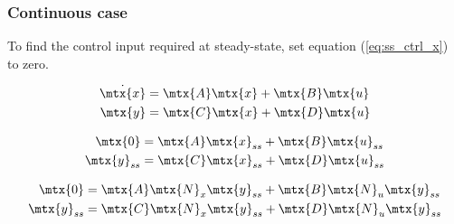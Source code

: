 \subsubsection{Continuous case}

To find the \gls{control input} required at steady-state, set equation
(\ref{eq:ss_ctrl_x}) to zero.

\begin{align*}
  \dot{\mtx{x}} &= \mtx{A}\mtx{x} + \mtx{B}\mtx{u} \\
  \mtx{y} &= \mtx{C}\mtx{x} + \mtx{D}\mtx{u}
\end{align*}

\begin{align*}
  \mtx{0} &= \mtx{A}\mtx{x}_{ss} + \mtx{B}\mtx{u}_{ss} \\
  \mtx{y}_{ss} &= \mtx{C}\mtx{x}_{ss} + \mtx{D}\mtx{u}_{ss}
\end{align*}

\begin{align*}
  \mtx{0} &= \mtx{A}\mtx{N}_x\mtx{y}_{ss} + \mtx{B}\mtx{N}_u\mtx{y}_{ss} \\
  \mtx{y}_{ss} &= \mtx{C}\mtx{N}_x\mtx{y}_{ss} + \mtx{D}\mtx{N}_u\mtx{y}_{ss}
\end{align*}

